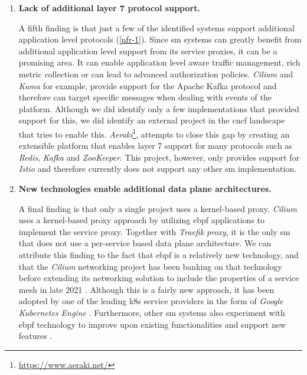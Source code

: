 \begin{enumerate}[label=\textbf{F\arabic*}, leftmargin=3\parindent]
    \item \textbf{Lack of additional layer 7 protocol support.}
    \label{f-5}
    
    A fifth finding is that just a few of the identified systems support additional application level protocols (\ref{nfr-1}). Since \gls{sm} systems can greatly benefit from additional application level support from its service proxies, it can be a promising area. It can enable application level aware traffic management, rich metric collection or can lead to advanced authorization policies. \textit{Cilium} and \textit{Kuma} for example, provide support for the Apache Kafka protocol and therefore can target specific messages when dealing with events of the platform.  Although we did identify only a few implementations that provided support for this, we did identify an external project in the \gls{cncf} landscape that tries to enable this. \textit{Aeraki}\footnote{\url{https://www.aeraki.net/}}, attempts to close this gap by creating an extensible platform that enables layer 7 support for many protocols such as \textit{Redis}, \textit{Kafka} and \textit{ZooKeeper}. This project, however, only provides support for \textit{Istio} and therefore currently does not support any other \gls{sm} implementation.
    
    \item \textbf{New technologies enable additional data plane architectures.}
    \label{f-6}
    
    A final finding is that only a single project uses a kernel-based proxy. \textit{Cilium} uses a kernel-based proxy approach by utilizing \gls{ebpf} applications to implement the service proxy. Together with \textit{Traefik proxy}, it is the only \gls{sm} that does not use a per-service based data plane architecture. We can attribute this finding to the fact that \gls{ebpf} is a relatively new technology, and that the \textit{Cilium} networking project has been banking on that technology before extending its networking solution to include the properties of a service mesh in late 2021 \cite{cilium-mesh}. Although this is a fairly new approach, it has been adopted by one of the leading \gls{k8s} service providers in the form of \textit{Google Kubernetes Engine} \cite{google-cilium-ebpf}. Furthermore, other \gls{sm} systems also experiment with \gls{ebpf} technology to improve upon existing functionalities and support new features \cite{istio-merbridge, nginx-service-mesh-arch}. 
\end{enumerate}



